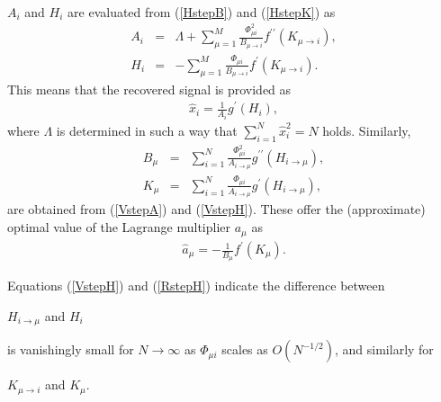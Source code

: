 \documentclass[12pt]{iopart}
\begin{document}
\\
$A_i$ and $H_i$ are evaluated from (\ref{HstepB}) and (\ref{HstepK}) as
\begin{eqnarray}
A_i&=&\Lambda+\sum_{\mu=1}^M \frac{\Phi_{\mu i}^2}{B_{\mu \to i}} 
f^{\prime \prime} (K_{\mu \to i}), \label{RstepA} \\
H_i&=& - \sum_{\mu=1}^M \frac{\Phi_{\mu i}}{B_{\mu \to i} }
f^{\prime }(K_{\mu \to i}).  \label{RstepH}
\end{eqnarray}
This means that the recovered signal is provided as
\begin{eqnarray}
\hat{x}_i =\frac{1}{A_i} g^\prime(H_i),  
\label{recoveredX}
\end{eqnarray}
where $\Lambda$ is determined in such a way that $\sum_{i=1}^N \hat{x}_i^2 =N$ holds. Similarly, 
\begin{eqnarray}
B_\mu&=& \sum_{i=1}^N \frac{\Phi_{\mu i}^2}{A_{i \to \mu}} g^{\prime \prime}(H_{i \to \mu}), \label{RstepB} \\
K_\mu&=& \sum_{i=1}^N \frac{\Phi_{\mu i}}{A_{i \to \mu}}g^{\prime}(H_{i \to \mu}), \label{RstepK} 
\end{eqnarray}
are obtained from (\ref{VstepA}) and (\ref{VstepH}). These offer the (approximate) optimal value of the Lagrange multiplier $a_\mu$ as
\begin{eqnarray}
\hat{a}_\mu=-\frac{1}{B_\mu} f^\prime(K_\mu). \label{recovereda}
\end{eqnarray}


Equations (\ref{VstepH}) and (\ref{RstepH}) indicate the difference between 

$H_{i \to \mu }$ and $H_{i}$ 

is vanishingly small for $N \to \infty$ as $\Phi_{\mu i}$ scales as $O\left (N^{-1/2} \right )$, and similarly for 

$K_{\mu \to i}$ and $K_\mu$. 
\end{document}

